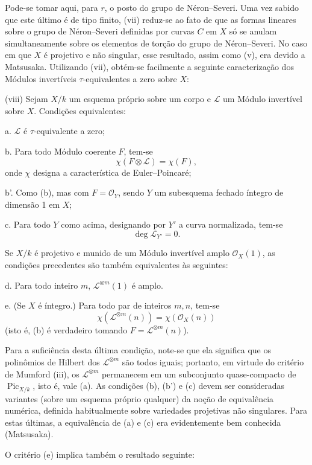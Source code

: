 Pode-se tomar aqui, para $r$, o posto do grupo de Néron--Severi. Uma vez sabido
que este último é de tipo finito, (vii) reduz-se ao fato de que as formas
lineares sobre o grupo de Néron--Severi definidas por curvas $C$ em $X$ só se
anulam simultaneamente sobre os elementos de torção do grupo de Néron--Severi.
No caso em que $X$ é projetivo e não singular, esse resultado, assim como (v),
era devido a Matsusaka. Utilizando (vii), obtém-se facilmente a seguinte
caracterização dos Módulos invertíveis $\tau$-equivalentes a zero sobre $X$:

\medskip
\noindent(viii) Sejam $X/k$ um esquema próprio sobre um corpo e $\mathcal L$ um
Módulo invertível sobre $X$. Condições equivalentes:

\noindent a. $\mathcal L$ é $\tau$-equivalente a zero;

\noindent b. Para todo Módulo coerente $F$, tem-se
\[
\chi(F\otimes\mathcal L)=\chi(F),
\]
onde $\chi$ designa a característica de Euler--Poincaré;

\noindent b'. Como (b), mas com $F=\mathcal O_Y$, sendo $Y$ um subesquema
fechado íntegro de dimensão 1 em $X$;

\noindent c. Para todo $Y$ como acima, designando por $Y'$ a curva normalizada,
tem-se
\[
\deg\mathcal L_{Y'}=0.
\]

Se $X/k$ é projetivo e munido de um Módulo invertível amplo
$\mathcal O_X(1)$, as condições precedentes são também equivalentes às
seguintes:

\noindent d. Para todo inteiro $m$, $\mathcal L^{\otimes m}(1)$ é amplo.

\noindent e. (Se $X$ é íntegro.) Para todo par de inteiros $m,n$, tem-se
\[
\chi(\mathcal L^{\otimes m}(n))=\chi(\mathcal O_X(n))
\]
(isto é, (b) é verdadeiro tomando $F=\mathcal L^{\otimes m}(n)$).

Para a suficiência desta última condição, note-se que ela significa que os
polinômios de Hilbert dos $\mathcal L^{\otimes m}$ são todos iguais; portanto,
em virtude do critério de Mumford (iii), os $\mathcal L^{\otimes m}$ permanecem
em um subconjunto quase-compacto de $\operatorname{Pic}_{X/k}$, isto é, vale
(a). As condições (b), (b') e (c) devem ser consideradas variantes (sobre um
esquema próprio qualquer) da noção de equivalência numérica, definida
habitualmente sobre variedades projetivas não singulares. Para estas últimas,
a equivalência de (a) e (c) era evidentemente bem conhecida (Matsusaka).

O critério (e) implica também o resultado seguinte:


